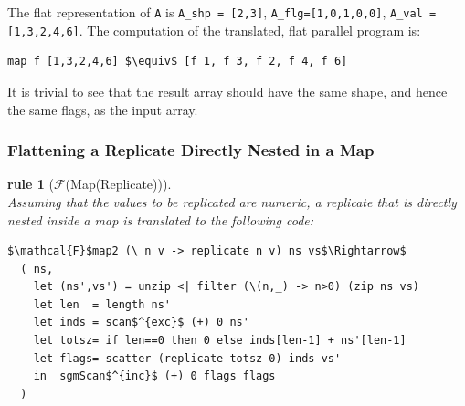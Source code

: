 \documentclass[acmsmall,review]{acmart}\settopmatter{printfolios=true,printccs=false,printacmref=false}
\newtheorem{rewrite}{rule}
\begin{document}
The flat representation of {\tt A} is {\tt A\_shp = [2,3]}, 
{\tt A\_flg=[1,0,1,0,0]}, {\tt A\_val = [1,3,2,4,6]}. 
The computation of the translated, flat parallel program is:
\begin{lstlisting}[mathescape=true]
map f [1,3,2,4,6] $\equiv$ [f 1, f 3, f 2, f 4, f 6]
\end{lstlisting}\vspace{-2ex}
It is trivial to see that the result array should have the same shape, 
and hence the same flags, as the input array.

\subsubsection{Flattening a Replicate Directly Nested in a Map}
\label{subsubsec:rep-in-map} 

\begin{rewrite}[$\mathcal{F}$(Map(Replicate))]\label{Flat-Rep-In-Map}
$\mbox{ }$\\
Assuming that the values to be replicated are numeric, a replicate that 
is directly nested inside a map is translated to the following code:
\begin{lstlisting}[mathescape=true]
$\mathcal{F}$map2 (\ n v -> replicate n v) ns vs$\Rightarrow$
  ( ns,
    let (ns',vs') = unzip <| filter (\(n,_) -> n>0) (zip ns vs)
    let len  = length ns'
    let inds = scan$^{exc}$ (+) 0 ns'
    let totsz= if len==0 then 0 else inds[len-1] + ns'[len-1]
    let flags= scatter (replicate totsz 0) inds vs'
    in  sgmScan$^{inc}$ (+) 0 flags flags
  )
\end{lstlisting}\vspace{-2ex}
\end{rewrite}
\end{document}
